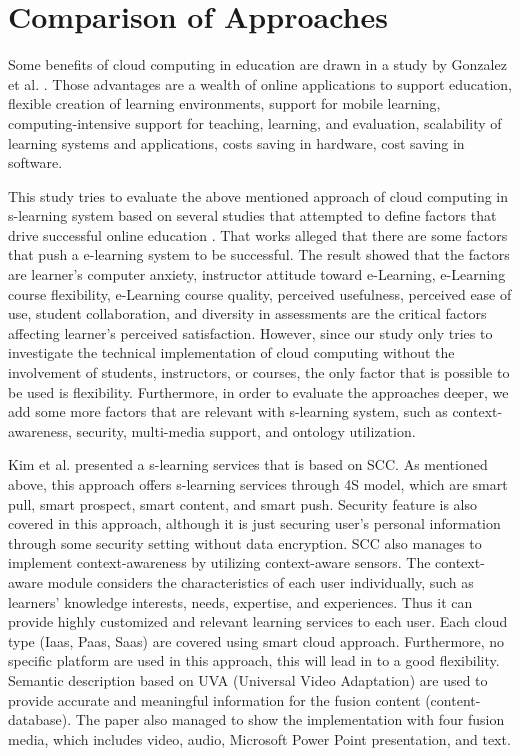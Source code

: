 \documentclass[journal]{vgtc}
\begin{document}
\section{Comparison of Approaches}
Some benefits of cloud computing in education are drawn in a study by Gonzalez et al. \cite{Gonzalez-Martinez2014}. Those advantages are a wealth of online applications to support education, flexible creation of learning environments, support for mobile learning, computing-intensive support for teaching, learning, and evaluation, scalability of learning systems and applications, costs saving in hardware, cost saving in software.

This study tries to evaluate the above mentioned approach of cloud computing in s-learning system based on several studies that attempted to define factors that drive successful online education \cite{Sun2008,Fetaji2007,Laily2013}. That works alleged that there are some factors that push a e-learning system to be successful. The result showed that the factors are learner's computer anxiety, instructor attitude toward e-Learning, e-Learning course flexibility, e-Learning course quality, perceived usefulness, perceived ease of use, student collaboration, and diversity in assessments are the critical factors affecting learner's perceived satisfaction. However, since our study only tries to investigate the technical implementation of cloud computing without the involvement of students, instructors, or courses, the only factor that is possible to be used is flexibility. Furthermore, in order to evaluate the approaches deeper, we add some more factors that are relevant with s-learning system, such as context-awareness, security, multi-media support, and ontology utilization.

Kim et al. presented a s-learning services that is based on SCC. As mentioned above, this approach offers s-learning services through 4S model, which are smart pull, smart prospect, smart content, and smart push. Security feature is also covered in this approach, although it is just securing user's personal information through some security setting without data encryption. SCC also manages to implement context-awareness by utilizing context-aware sensors. The context-aware module considers the characteristics of each user individually, such as learners' knowledge interests, needs, expertise, and experiences. Thus it can provide highly customized and relevant learning services to each user. Each cloud type (Iaas, Paas, Saas) are covered using smart cloud approach. Furthermore, no specific platform are used in this approach, this will lead in to a good flexibility. Semantic description based on UVA (Universal Video Adaptation) are used to provide accurate and meaningful information for the fusion content (content-database). The paper also managed to show the implementation with four fusion media, which includes video, audio, Microsoft Power Point presentation, and text.
\end{document}
